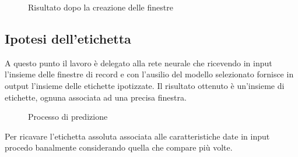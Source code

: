 \begin{figure}[H]
    \centering
    
    \caption{Risultato dopo la creazione delle finestre}
    \label{fig:segments}
\end{figure}



\subsection{Ipotesi dell'etichetta}
A questo punto il lavoro è delegato alla rete neurale che ricevendo in input l'insieme delle finestre di record  
e con l'ausilio del modello selezionato fornisce in output l'insieme delle etichette ipotizzate.
Il risultato ottenuto è un'insieme di etichette, ognuna associata ad una precisa finestra. 

\begin{figure}[H]
    \centering
    
    \caption{Processo di predizione}
    \label{fig:prediction}
\end{figure}

\noindent Per ricavare l'etichetta assoluta associata alle caratteristiche date in input procedo banalmente 
considerando quella che compare più volte.